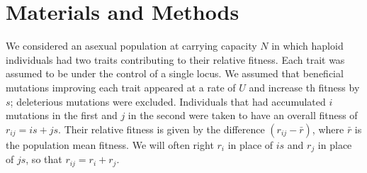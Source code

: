 \documentclass[11pt,twocolumn]{article}
\begin{document}
\section*{Materials and Methods}
\label{sec:materials:methods}

We considered an asexual population at carrying capacity $N$ in which haploid individuals had two traits contributing to their relative fitness. Each trait was assumed to be under the control of a single locus. We assumed that beneficial mutations improving each trait appeared at a rate of $U$ and increase th fitness by $s$; deleterious mutations were excluded. Individuals that had accumulated $i$ mutations in the first and $j$ in the second were taken to have an overall fitness of $r_{ij} = i s+j s$.  Their relative fitness is given by the difference $(r_{ij}-\bar{r})$, where  $\bar{r} $  is the population mean fitness.  We will often right $r_i$ in place of $i s$ and $r_j$ in place of $j s$, so that $r_{ij} = r_i + r_j$. 
% 
% 
% 
%
\end{document}

